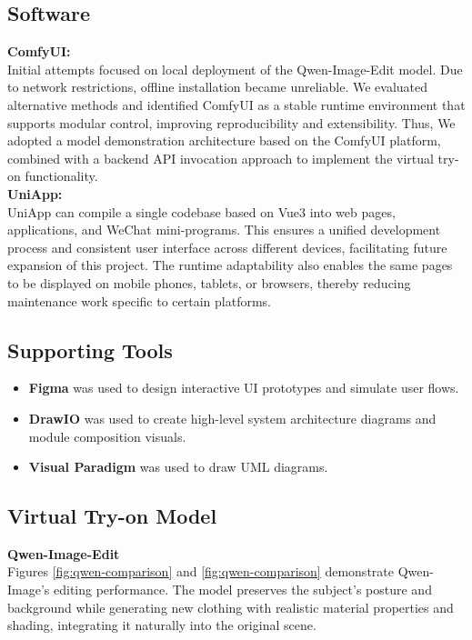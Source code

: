 \subsection{Software}
\textbf{\large ComfyUI:}\\[0.4cm]
Initial attempts focused on local deployment of the Qwen-Image-Edit model. Due to network restrictions, offline installation became unreliable. We evaluated alternative methods and identified ComfyUI as a stable runtime environment that supports modular control, improving reproducibility and extensibility. Thus, We adopted a model demonstration architecture based on the ComfyUI platform, combined with a backend API invocation approach to implement the virtual try-on functionality.\\

\textbf{\large UniApp:}\\[0.4cm]
UniApp can compile a single codebase based on Vue3 into web pages, applications, and WeChat mini-programs. This ensures a unified development process and consistent user interface across different devices, facilitating future expansion of this project. The runtime adaptability also enables the same pages to be displayed on mobile phones, tablets, or browsers, thereby reducing maintenance work specific to certain platforms.


\subsection{Supporting Tools}
\begin{itemize}
\item \textbf{Figma} was used to design interactive UI prototypes and simulate user flows.
\item \textbf{DrawIO} was used to create high-level system architecture diagrams and module composition visuals.
\item \textbf{Visual Paradigm} was used to draw UML diagrams. 
\end{itemize}


\subsection{Virtual Try-on Model}
\label{Chapter: Model Comparison and Selection}

\textbf{\large Qwen-Image-Edit}\\[0.4cm]
Figures \ref{fig:qwen-comparison} and \ref{fig:qwen-comparison} demonstrate Qwen-Image’s editing performance. The model preserves the subject’s posture and background while generating new clothing with realistic material properties and shading, integrating it naturally into the original scene.

